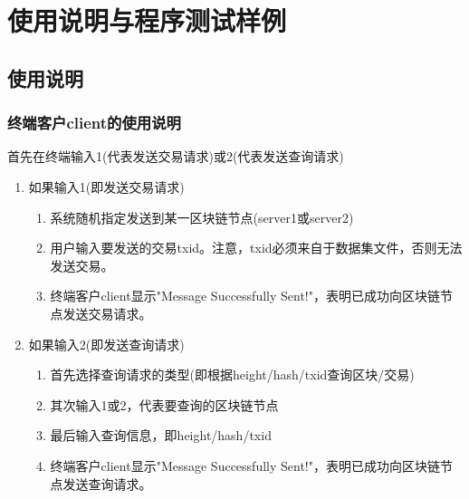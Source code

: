 \documentclass[10pt,a4paper]{article}
\begin{document}
    \newpage
    \section{使用说明与程序测试样例}
    \subsection{使用说明}
    \subsubsection{终端客户client的使用说明}
    \noindent 首先在终端输入1(代表发送交易请求)或2(代表发送查询请求)
    \begin{enumerate}
        \item 如果输入1(即发送交易请求)
        \begin{enumerate}
            \item 系统随机指定发送到某一区块链节点(server1或server2)
            \item 用户输入要发送的交易txid。注意，txid必须来自于数据集文件，否则无法发送交易。
            \item 终端客户client显示"Message Successfully Sent!"，表明已成功向区块链节点发送交易请求。
        \end{enumerate} 
        \item 如果输入2(即发送查询请求)
        \begin{enumerate}
            \item 首先选择查询请求的类型(即根据height/hash/txid查询区块/交易)
            \item 其次输入1或2，代表要查询的区块链节点
            \item 最后输入查询信息，即height/hash/txid
            \item 终端客户client显示"Message Successfully Sent!"，表明已成功向区块链节点发送查询请求。
        \end{enumerate}
    \end{enumerate}
\end{document}
